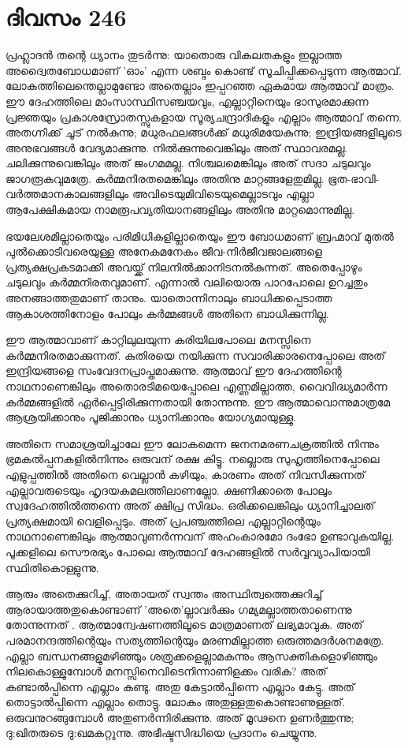 \section{ദിവസം 246}


പ്രഹ്ലാദന്‍ തന്റെ ധ്യാനം തുടര്‍ന്നു: യാതൊരു വികലതകളും ഇല്ലാത്ത അദ്വൈതബോധമാണ്  'ഓം' എന്ന ശബ്ദം കൊണ്ട് സൂചിപ്പിക്കപ്പെടുന്ന ആത്മാവ്. ലോകത്തിലെന്തെല്ലാമുണ്ടോ അതെല്ലാം ഇപ്പറഞ്ഞ ഏകമായ ആത്മാവ് മാത്രം. ഈ ദേഹത്തിലെ മാംസാസ്ഥിസഞ്ചയവും, എല്ലാറ്റിനെയും ഭാസുരമാക്കുന്ന പ്രജ്ഞയും പ്രകാശസ്രോതസ്സുകളായ സൂര്യചന്ദ്രാദികളും എല്ലാം ആത്മാവ് തന്നെ. അതഗ്നിക്ക് ചൂട് നല്‍കുന്നു; മധുരഫലങ്ങള്‍ക്ക് മധുരിമയേകുന്നു; ഇന്ദ്രിയങ്ങളിലൂടെ അനുഭവങ്ങള്‍ വേദ്യമാക്കുന്നു. നില്‍ക്കുന്നുവെങ്കിലും അത് സ്ഥാവരമല്ല. ചലിക്കുന്നുവെങ്കിലും അത് ജംഗമമല്ല. നിശ്ചലമെങ്കിലും അത് സദാ ചടുലവും ജാഗരൂകവുമത്രേ. കര്‍മ്മനിരതമെങ്കിലും അതിനു മാറ്റങ്ങളേതുമില്ല. ഭൂത-ഭാവി-വര്‍ത്തമാനകാലങ്ങളിലും അവിടെയുമിവിടെയുമെല്ലാടവും എല്ലാ ആപേക്ഷികമായ നാമരൂപവ്യതിയാനങ്ങളിലും അതിനു മാറ്റമൊന്നുമില്ല.

ഭയലേശമില്ലാതെയും പരിമിധികളില്ലാതെയും ഈ ബോധമാണ് ബ്രഹ്മാവ്‌ മുതല്‍ പുല്‍ക്കൊടിവരെയുള്ള അനേകമനേകം ജീവ-നിര്‍ജീവജാലങ്ങളെ പ്രത്യക്ഷപ്രകടമാക്കി അവയ്ക്ക് നിലനില്‍ക്കാനിടനല്‍കുന്നത്. അതെപ്പോഴും ചടുലവും കര്‍മ്മനിരതവുമാണ്. എന്നാല്‍ വലിയൊരു പാറപോലെ ഉറച്ചതും അനങ്ങാത്തതുമാണ് താനും. യാതൊന്നിനാലും ബാധിക്കപ്പെടാത്ത ആകാശത്തിനോളം പോലും കര്‍മ്മങ്ങള്‍ അതിനെ ബാധിക്കുന്നില്ല. 

ഈ ആത്മാവാണ് കാറ്റിലുലയുന്ന കരിയിലപോലെ മനസ്സിനെ കര്‍മ്മനിരതമാക്കുന്നത്. കുതിരയെ നയിക്കുന്ന സവാരിക്കാരനെപ്പോലെ അത് ഇന്ദ്രിയങ്ങളെ സംവേദനപ്രാപ്തമാക്കുന്നു. ആത്മാവ് ഈ ദേഹത്തിന്റെ നാഥനാണെങ്കിലും അതൊരടിമയെപ്പോലെ എണ്ണമില്ലാത്ത, വൈവിദ്ധ്യമാര്‍ന്ന കര്‍മ്മങ്ങളില്‍ ഏര്‍പ്പെട്ടിരിക്കുന്നതായി തോന്നുന്നു. ഈ ആത്മാവൊന്നുമാത്രമേ ആശ്രയിക്കാനും പൂജിക്കാനും ധ്യാനിക്കാനും യോഗ്യമായുള്ളു. 

അതിനെ സമാശ്രയിച്ചാലേ ഈ ലോകമെന്ന ജനനമരണചക്രത്തില്‍ നിന്നും ഭ്രമകല്‍പ്പനകളില്‍നിന്നും ഒരുവന് രക്ഷ കിട്ടൂ. നല്ലൊരു സുഹൃത്തിനെപ്പോലെ എളുപ്പത്തില്‍ അതിനെ വെല്ലാന്‍ കഴിയും, കാരണം അത് നിവസിക്കുന്നത് എല്ലാവരുടെയും ഹൃദയകമലത്തിലാണല്ലോ. ക്ഷണിക്കാതെ പോലും സ്വദേഹത്തില്‍ത്തന്നെ അത് ക്ഷിപ്ര സിദ്ധം. ഒരിക്കലെങ്കിലും ധ്യാനിച്ചാലത് പ്രത്യക്ഷമായി വെളിപ്പെടും. അത് പ്രപഞ്ചത്തിലെ എല്ലാറ്റിന്റെയും നാഥനാണെങ്കിലും ആത്മാവുണര്‍ന്നവന് അഹംകാരമോ ദംഭോ ഉണ്ടാവുകയില്ല. പൂക്കളിലെ സൌരഭ്യം പോലെ ആത്മാവ് ദേഹങ്ങളില്‍ സര്‍വ്വവ്യാപിയായി സ്ഥിതികൊള്ളുന്നു.  

ആരും അതെക്കുറിച്ച്, അതായത് സ്വന്തം അസ്ഥിത്വത്തെക്കുറിച്ച് ആരായാത്തതുകൊണ്ടാണ് 'അതെ'ല്ലാവര്‍ക്കും ഗമ്യമല്ലാത്തതാണെന്നു തോന്നുന്നത് . ആത്മാന്വേഷണത്തിലൂടെ മാത്രമാണത്‌ ലഭ്യമാവുക. അത് പരമാനന്ദത്തിന്റെയും സത്യത്തിന്റെയും മരണമില്ലാത്ത ഒരുത്തമദര്‍ശനമത്രേ. എല്ലാ ബന്ധനങ്ങളുമഴിഞ്ഞും  ശത്രുക്കളെല്ലാമകന്നും ആസക്തികളൊഴിഞ്ഞും നിലകൊള്ളുമ്പോള്‍ മനസ്സിനെവിടെനിന്നാണിളക്കം വരിക?  അത് കണ്ടാല്‍പ്പിന്നെ എല്ലാം കണ്ടു. അതു കേട്ടാല്‍പ്പിന്നെ എല്ലാം കേട്ടു. അത് തൊട്ടാല്‍പ്പിന്നെ എല്ലാം തൊട്ടു. ലോകം അതുള്ളതുകൊണ്ടാണുള്ളത്. ഒരുവനുറങ്ങുമ്പോള്‍ അതുണര്‍ന്നിരിക്കുന്നു. അത് മൂഢനെ ഉണര്‍ത്തുന്നു; ദു:ഖിതരുടെ ദു:ഖമകറ്റുന്നു. അഭീഷ്ടസിദ്ധിയെ പ്രദാനം ചെയ്യുന്നു.

